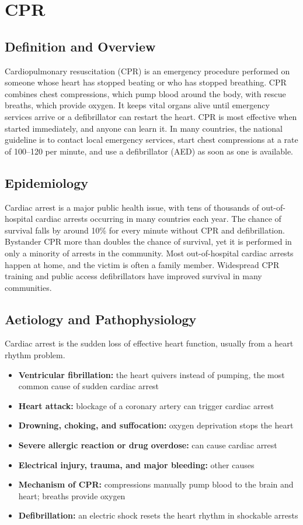 \chapter{CPR}

\section*{Definition and Overview}
Cardiopulmonary resuscitation (CPR) is an emergency procedure performed on someone whose heart has stopped beating or who has stopped breathing. CPR combines chest compressions, which pump blood around the body, with rescue breaths, which provide oxygen. It keeps vital organs alive until emergency services arrive or a defibrillator can restart the heart. CPR is most effective when started immediately, and anyone can learn it. In many countries, the national guideline is to contact local emergency services, start chest compressions at a rate of 100--120 per minute, and use a defibrillator (AED) as soon as one is available.

\section*{Epidemiology}
Cardiac arrest is a major public health issue, with tens of thousands of out-of-hospital cardiac arrests occurring in many countries each year. The chance of survival falls by around 10\% for every minute without CPR and defibrillation. Bystander CPR more than doubles the chance of survival, yet it is performed in only a minority of arrests in the community. Most out-of-hospital cardiac arrests happen at home, and the victim is often a family member. Widespread CPR training and public access defibrillators have improved survival in many communities.

\section*{Aetiology and Pathophysiology}
Cardiac arrest is the sudden loss of effective heart function, usually from a heart rhythm problem.

\begin{itemize}
    \item \textbf{Ventricular fibrillation:} the heart quivers instead of pumping, the most common cause of sudden cardiac arrest
    \item \textbf{Heart attack:} blockage of a coronary artery can trigger cardiac arrest
    \item \textbf{Drowning, choking, and suffocation:} oxygen deprivation stops the heart
    \item \textbf{Severe allergic reaction or drug overdose:} can cause cardiac arrest
    \item \textbf{Electrical injury, trauma, and major bleeding:} other causes
    \item \textbf{Mechanism of CPR:} compressions manually pump blood to the brain and heart; breaths provide oxygen
    \item \textbf{Defibrillation:} an electric shock resets the heart rhythm in shockable arrests
\end{itemize}

